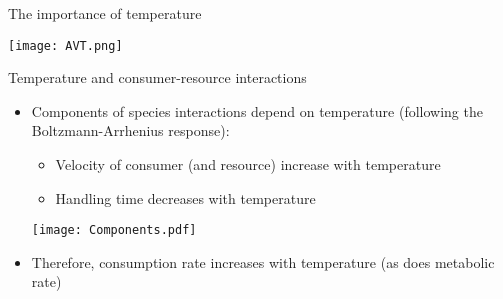   \begin{frame}{The importance of temperature}
  
    \begin{center}
      \texttt{[image: AVT.png]}\\
     \end{center}
      
    \end{frame}
    
\begin{frame}{Temperature and consumer-resource interactions}
  
\begin{itemize}[<+->]\setlength{\itemindent}{-1em}
    \item Components of species interactions depend on temperature (following the Boltzmann-Arrhenius response)\footnotemark:        
      \begin{itemize}\setlength{\itemindent}{-1em}
        \item Velocity of consumer (and resource) increase with temperature 
        \item Handling time decreases with temperature
      \end{itemize}
    \begin{center}
      \texttt{[image: Components.pdf]}
    \end{center}
    \item Therefore, consumption rate increases with temperature (as does metabolic rate)
\end{itemize}

  \end{frame}

